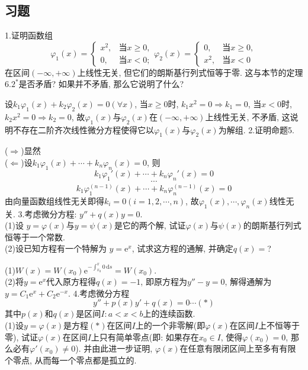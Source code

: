 \documentclass[titlepage,11pt,a4paper,twoside]{report}
\makeatletter
\newcommand\diff{\,\mathrm{d}}
\newcommand\e{\mathrm{e}}
\renewenvironment{proof}{\par
	\pushQED{\qed}%
	\normalfont \topsep1\p@\@plus6\p@\relax
	\trivlist
	\item\relax
	{\hspace*{\parindent}{\heiti 证明}\@addpunct{:}}\hspace\labelsep\ignorespaces
}{%
	\popQED\endtrivlist\@endpefalse
}
\newenvironment{solve}{\par
	\pushQED{\qed}%
	\normalfont \topsep1\p@\@plus6\p@\relax
	\trivlist
	\item\relax
	{\hspace*{\parindent}{\heiti 解}\@addpunct{:}}\hspace\labelsep\ignorespaces
}{%
	\popQED\endtrivlist\@endpefalse
}
\makeatother
\begin{document}
\subsection{习题}
1.证明函数组\[\varphi_1(x)=\begin{cases}x^2,&\mbox{当}x\geq0,\\0,&\mbox{当}x<0;\end{cases}\varphi_2(x)=\begin{cases}0,&\mbox{当}x\geq0,\\x^2,&\mbox{当}x<0\end{cases}\]
在区间$(-\infty,+\infty)$上线性无关, 但它们的朗斯基行列式恒等于零. 这与本节的定理$6.2^*$是否矛盾? 如果并不矛盾, 那么它说明了什么?
\begin{proof} 设$k_1\varphi_1(x)+k_2\varphi_2(x)=0(\forall x)$, 当$x\geq0$时, $k_1x^2=0\Rightarrow k_1=0$, 当$x<0$时, $k_2x^2=0\Rightarrow k_2=0$, 故$\varphi_1(x)$与$\varphi_2(x)$在$(-\infty,+\infty)$上线性无关, 不矛盾, 这说明不存在二阶齐次线性微分方程使得它以$\varphi_1(x)$与$\varphi_2(x)$为解组.
\end{proof}
2.证明命题5.
\begin{proof} 
($\Rightarrow$)显然\\
($\Leftarrow$)设$k_1\varphi_1(x)+\cdots+k_n\varphi_n(x)=0$, 则
\[k_1\varphi_1'(x)+\cdots+k_n\varphi_n'(x)=0\]
\[\cdots\]
\[k_1\varphi_1^{(n-1)}(x)+\cdots+k_n\varphi_n^{(n-1)}(x)=0\]
由向量函数组线性无关即得$k_i=0(i=1,2,\cdots,n)$, 故$\varphi_1(x),\cdots,\varphi_n(x)$线性无关.
\end{proof}
3.考虑微分方程: $y''+q(x)y=0$.\\
(1)设 $y=\varphi(x)$与$y=\psi(x)$是它的两个解, 试证$\varphi(x)$与$\psi(x)$的朗斯基行列式恒等于一个常数.\\
(2)设已知方程有一个特解为 $y=\e^x$, 试求这方程的通解, 并确定$q(x)=$?
\begin{solve}
(1)$W(x)=W(x_0)\e^{-\int_{x_0}^x0\diff s}=W(x_0)$.\\
(2)将$y=\e^x$代入原方程得$q(x)=-1$, 即原方程为$y''-y=0$, 解得通解为$y=C_1\e^x+C_2\e^{-x}$.
\end{solve}
4.考虑微分方程\[y''+p(x)y'+q(x)=0\cdots(*)\]
其中$p(x)$和$q(x)$是区间$I:a<x<b$上的连续函数.\\
(1)设$y=\varphi(x)$是方程$(*)$在区间$I$上的一个非零解(即$\varphi(x)$在区间$I$上不恒等于零), 试证$\varphi(x)$在区间$I$上只有简单零点(即: 如果存在$x_0\in I$, 使得$\varphi(x_0)=0$, 那么必有$\varphi'(x_0)\neq0$). 并由此进一步证明, $\varphi(x)$在任意有限闭区间上至多有有限个零点, 从而每一个零点都是孤立的.\\
\end{document}

